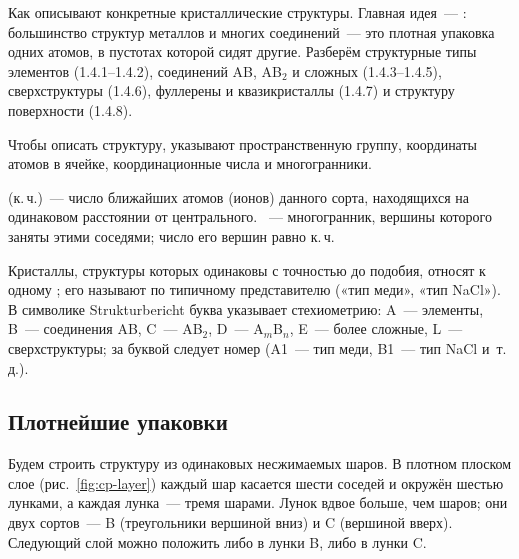 \begin{orientir}
Как описывают конкретные кристаллические структуры. Главная идея~—
: большинство структур
металлов и многих соединений~— это плотная упаковка одних атомов, в
пустотах которой сидят другие. Разберём структурные типы элементов
(1.4.1--1.4.2), соединений AB, AB$_2$ и сложных (1.4.3--1.4.5),
сверхструктуры (1.4.6), фуллерены и квазикристаллы (1.4.7) и структуру
поверхности (1.4.8).
\end{orientir}

Чтобы описать структуру, указывают пространственную группу, координаты
атомов в ячейке, координационные числа и многогранники.

\begin{opredelenie}[Координация]
 (к.\,ч.)~— число ближайших атомов (ионов)
данного сорта, находящихся на одинаковом расстоянии от центрального.
~— многогранник, вершины которого
заняты этими соседями; число его вершин равно к.\,ч.
\end{opredelenie}

Кристаллы, структуры которых одинаковы с точностью до подобия, относят к
одному ; его называют по типичному представителю
(«тип меди», «тип NaCl»). В символике Strukturbericht буква указывает
стехиометрию: A~— элементы, B~— соединения AB, C~— AB$_2$, D~—
A$_m$B$_n$, E~— более сложные, L~— сверхструктуры; за буквой следует номер
(A1~— тип меди, B1~— тип NaCl и~т.\,д.).

\subsection{Плотнейшие упаковки}\label{ssec:packings}

Будем строить структуру из одинаковых несжимаемых шаров. В плотном
плоском слое (рис.~\ref{fig:cp-layer}) каждый шар касается шести соседей и
окружён шестью лунками, а каждая лунка~— тремя шарами. Лунок вдвое больше,
чем шаров; они двух сортов~— B (треугольники вершиной вниз) и C (вершиной
вверх). Следующий слой можно положить либо в лунки B, либо в лунки C.

